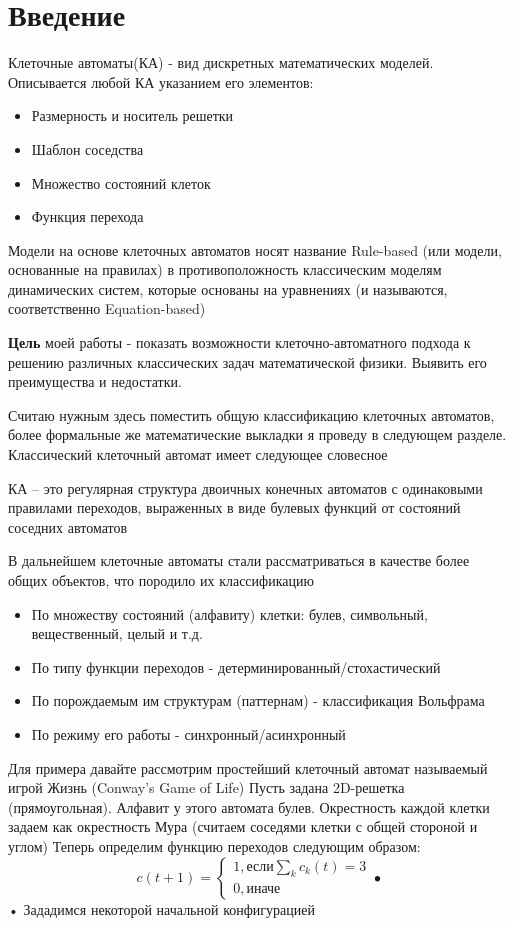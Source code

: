 \section*{Введение}
Клеточные автоматы(КА) - вид дискретных математических моделей. Описывается любой КА указанием его элементов:
\begin{itemize}
\item Размерность и носитель решетки
\item Шаблон соседства
\item Множество состояний клеток
\item Функция перехода
\end{itemize}

Модели на основе клеточных автоматов носят название Rule-based (или модели, основанные на правилах) в противоположность классическим моделям динамических систем, которые основаны на уравнениях (и называются, соответственно Equation-based)

\textbf{Цель} моей работы - показать возможности клеточно-автоматного подхода к решению различных классических задач математической физики. Выявить его преимущества и недостатки.

Считаю нужным здесь поместить общую классификацию клеточных автоматов, более формальные же математические выкладки я проведу в следующем разделе. Классический клеточный автомат имеет следующее словесное
 \begin{defn}
 КА – это регулярная структура двоичных конечных автоматов с одинаковыми правилами переходов, выраженных в виде булевых функций от состояний соседних автоматов 
 \end{defn}
 В дальнейшем клеточные автоматы стали рассматриваться в качестве более общих объектов, что породило их классификацию
 \begin{itemize}
\item По множеству состояний (алфавиту) клетки: булев, символьный, вещественный, целый и т.д.
\item По типу функции переходов - детерминированный/стохастический
\item По порождаемым им структурам (паттернам) - классификация Вольфрама
\item По режиму его работы - синхронный/асинхронный
\end{itemize}

Для примера давайте рассмотрим простейший клеточный автомат называемый игрой Жизнь (Conway's Game of Life)
Пусть задана 2D-решетка (прямоугольная). Алфавит у этого автомата булев.
Окрестность каждой клетки задаем как окрестность Мура (считаем соседями клетки с общей стороной и углом)
Теперь определим функцию переходов следующим образом:
\begin{equation*}
c(t+1) = \begin{cases}
1, \text{если} \sum_k {c_k(t)} =3 \\
0, \text{иначе}
\end{cases}•
\end{equation*}•
Зададимся некоторой начальной конфигурацией
